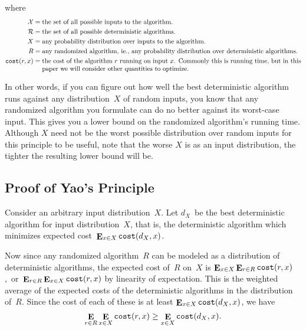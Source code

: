where \begin{align*}
\mathcal{X} =&\; \text{the set of all possible inputs to the algorithm.}
\\
\mathcal{R} =&\; \text{the set of all possible deterministic algorithms.}
\\
X =&\; \text{any probability distribution over inputs to the algorithm.}
\\
R =&\; \text{\parbox[t]{5.5in}{any randomized algorithm, ie., any probability distribution over deterministic algorithms.}}
\\
\texttt{cost}(r, x) =&\; \text{\parbox[t]{5.5in}{the cost of the algorithm~$r$ running on input~$x$. Commonly this is running time, but in this paper we will consider other quantities to optimize.}}
\end{align*}

In other words, if you can figure out how well the best deterministic algorithm runs against any distribution~$X$ of random inputs, you know that any randomized algorithm you formulate can do no better against its worst-case input. This gives you a lower bound on the randomized algorithm's running time.
Although $X$ need not be the worst possible distribution over random inputs for this principle to be useful, note that the worse $X$ is as an input distribution, the tighter the resulting lower bound will be.


\subsection{Proof of Yao's Principle}

Consider an arbitrary input distribution~$X$. Let $d_X$~be the best deterministic algorithm for input distribution~$X$, that is, the deterministic algorithm which minimizes expected cost~$\mathop{\mathbf{E}}_{x\in X}\texttt{cost}(d_X,x)$.

Now since any randomized algorithm~$R$ can be modeled as a distribution of deterministic algorithms, the expected cost of~$R$ on~$X$ is $\mathop{\mathbf{E}}_{x\in X}\mathop{\mathbf{E}}_{r\in R}\texttt{cost}(r,x)$,~or~$\mathop{\mathbf{E}}_{r\in R}\mathop{\mathbf{E}}_{x\in X}\texttt{cost}(r,x)$ by linearity of expectation. This is the weighted average of the expected costs of the deterministic algorithms in the distribution of~$R$. Since the cost of each of these is at least $\mathop{\mathbf{E}}_{x\in X}\texttt{cost}(d_X,x)$, we have
\[\mathop{\mathbf{E}}_{r\in R}\mathop{\mathbf{E}}_{x\in X}\texttt{cost}(r,x) \ge \mathop{\mathbf{E}}_{x\in X}\texttt{cost}(d_X,x).\]

